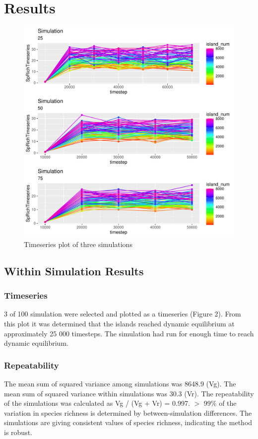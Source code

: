 \documentclass{article}
\begin{document}
\section{Results}

\begin{figure}[!h]
\centering
  \includegraphics[scale=0.5]{../../Results/Simulation/TimeseriesPlot.pdf}
  \caption{Timeseries plot of three simulations}
  \label{fig:Timeseries plot}
\end{figure}

\subsection{Within Simulation Results}

\subsubsection{Timeseries}
3 of 100 simulation were selected and plotted as a timeseries (Figure 2). From this plot it was determined that the islands reached dynamic equilibrium at approximately 25 000 timesteps. The simulation had run for enough time to reach dynamic equilibrium.

\subsubsection{Repeatability} %
The mean sum of squared variance among simulations was 8648.9 (Vg). The mean sum of squared variance within simulations was 30.3 (Vr). The repeatability of the simulations was calculated as Vg / (Vg + Vr)  = 0.997. $>$ 99\% of the variation in species richness is determined by between-simulation differences. The simulations are giving consistent values of species richness, indicating the method is robust. 
\end{document}
